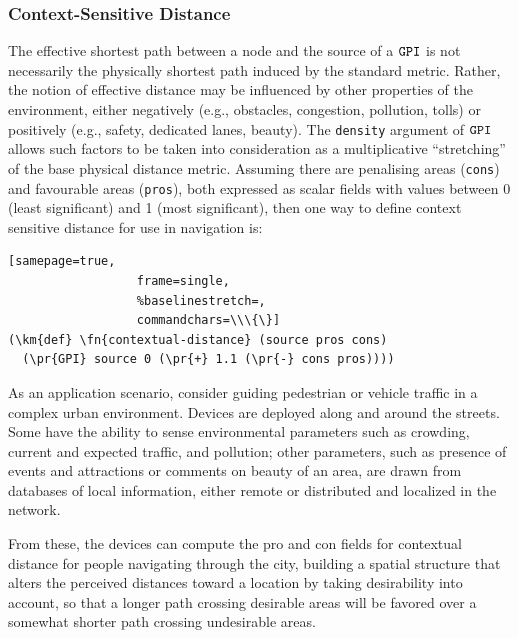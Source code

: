 \documentclass[12pt,a4paper,twoside,openright]{book}
\begin{document}
\subsubsection{Context-Sensitive Distance}

The effective shortest path between a node and the source of a $\texttt{GPI}$ is not necessarily the physically shortest path induced by the standard metric.
%
Rather, the notion of effective distance may be influenced by other properties of the environment, either negatively (e.g., obstacles, congestion, pollution, tolls) or positively (e.g., safety, dedicated lanes, beauty).
%
The {\tt density} argument of $\texttt{GPI}$ allows such factors to be taken into consideration as a multiplicative ``stretching'' of the base physical distance metric.
%
Assuming there are penalising areas (\texttt{cons}) and favourable areas (\texttt{pros}), both expressed as scalar fields with values between 0 (least significant) and 1 (most significant), then one way to define context sensitive distance for use in navigation is:
\begin{Verbatim}[samepage=true,
                  frame=single,
                  %baselinestretch=,
                  commandchars=\\\{\}]
(\km{def} \fn{contextual-distance} (source pros cons)
  (\pr{GPI} source 0 (\pr{+} 1.1 (\pr{-} cons pros))))
\end{Verbatim}


As an application scenario, consider guiding pedestrian or vehicle traffic in a complex urban environment.  Devices are deployed along and around the streets.
%
Some have the ability to sense environmental parameters such as crowding, current and expected traffic, and pollution; other parameters, such as presence of events and attractions or comments on
beauty of an area, are drawn from databases of local information, either remote or distributed and localized in the network.  

From these, the devices can compute the pro and con fields for contextual distance for people navigating through the city, building a spatial structure that alters the perceived distances toward a location by taking desirability into account, so that a longer path crossing desirable areas will be favored over a somewhat shorter path crossing undesirable areas.
\end{document}
